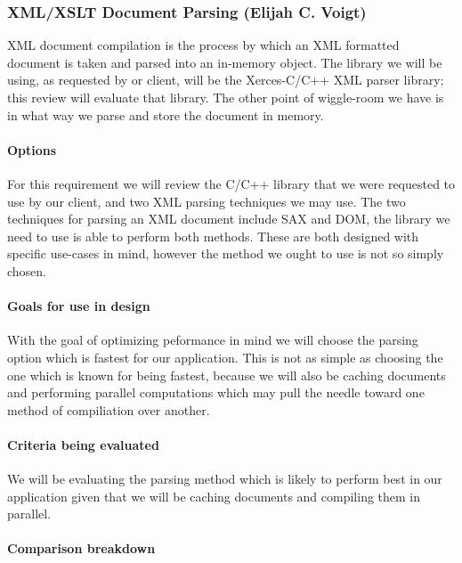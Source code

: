 \subsubsection{XML/XSLT Document Parsing (Elijah C. Voigt)}

XML document compilation is the process by which an XML formatted document is taken and parsed into an in-memory object.
The library we will be using, as requested by or client, will be the Xerces-C/C++ XML parser library; this review will evaluate that library.
The other point of wiggle-room we have is in what way we parse and store the document in memory.

\paragraph{Options}

For this requirement we will review the C/C++ library that we were requested to use by our client, and two XML parsing techniques we may use.
The two techniques for parsing an XML document include SAX and DOM, the library we need to use is able to perform both methods.
These are both designed with specific use-cases in mind, however the method we ought to use is not so simply chosen.

\paragraph{Goals for use in design}

With the goal of optimizing peformance in mind we will choose the parsing option which is fastest for our application.
This is not as simple as choosing the one which is known for being fastest, because we will also be caching documents and performing parallel computations which may pull the needle toward one method of compiliation over another.

\paragraph{Criteria being evaluated}

We will be evaluating the parsing method which is likely to perform best in our application given that we will be caching documents and compiling them in parallel.

\paragraph{Comparison breakdown}

